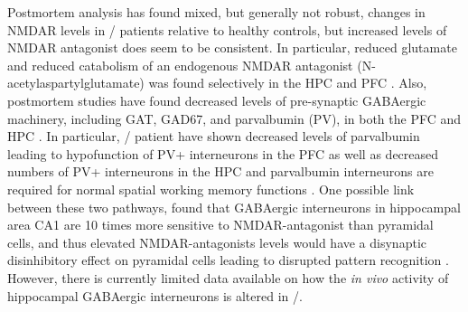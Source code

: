 Postmortem analysis has found mixed, but generally not robust, changes in NMDAR levels in \scz/ patients relative to healthy controls, but increased levels of NMDAR antagonist does seem to be consistent.
In particular, reduced glutamate and reduced catabolism of an endogenous NMDAR antagonist (N-acetylaspartylglutamate) was found selectively in the \ac{HPC} and \ac{PFC} \citep{Tsai1995}. 
Also, postmortem studies have found decreased levels of pre-synaptic GABAergic machinery, including GAT, GAD67, and parvalbumin (PV), in both the \ac{PFC} and HPC \citep{Coyle2006, Zhang2002, Konradi2011}.
In particular, \scz/ patient have shown decreased levels of parvalbumin leading to hypofunction of PV+ interneurons in the \ac{PFC} as well as decreased numbers of PV+ interneurons in the HPC \citep{Zhang2002, Lewis2005} and parvalbumin interneurons are required for normal spatial working memory functions \citep{Korotkova2010, Murray2011}.
One possible link between these two pathways, \citeauthor{Grunze1996} found that GABAergic interneurons in hippocampal area CA1 are 10 times more sensitive to NMDAR-antagonist than pyramidal cells, and thus elevated NMDAR-antagonists levels would have a disynaptic disinhibitory effect on pyramidal cells leading to disrupted pattern recognition \citep{Grunze1996}.
However, there is currently limited data available on how the \emph{in vivo} activity of hippocampal GABAergic interneurons is altered in \scz/.
